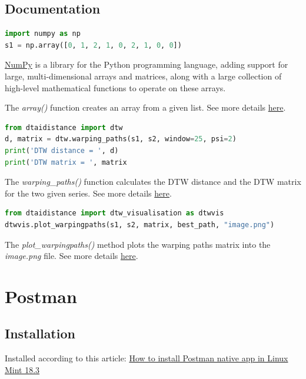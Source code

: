 \documentclass[12pt, a4paper, portrait]{article}
\begin{document}
\subsection{Documentation}
\begin{lstlisting}[language=Python]
import numpy as np
s1 = np.array([0, 1, 2, 1, 0, 2, 1, 0, 0])
\end{lstlisting}
\par\href{http://www.numpy.org/}{NumPy} is a library for the Python programming language, adding support for large, multi-dimensional arrays and matrices, along with a large collection of high-level mathematical functions to operate on these arrays.
\par The \textit{array()} function creates an array from a given list. See more details \href{https://docs.scipy.org/doc/numpy/reference/generated/numpy.array.html#numpy.array}{here}.
\newline
\begin{lstlisting}[language=Python]
from dtaidistance import dtw
d, matrix = dtw.warping_paths(s1, s2, window=25, psi=2)
print('DTW distance = ', d)
print('DTW matrix = ', matrix
\end{lstlisting}

\par The \textit{warping\_paths()} function calculates the DTW distance and the DTW matrix for the two given series. See more details
\href{https://dtaidistance.readthedocs.io/en/latest/modules/dtw.html?highlight=warping_paths#dtaidistance.dtw.warping_paths}{here}.
\newline

\begin{lstlisting}[language=Python]
from dtaidistance import dtw_visualisation as dtwvis
dtwvis.plot_warpingpaths(s1, s2, matrix, best_path, "image.png")
\end{lstlisting}
\par The \textit{plot\_warpingpaths()} method plots the warping paths matrix into the \textit{image.png} file. See more details \href{https://dtaidistance.readthedocs.io/en/latest/modules/dtw_visualisation.html}{here}.


\pagebreak
\section{Postman}
\subsection{Installation}
Installed according to this article: \href{https://r00t4bl3.com/post/how-to-install-postman-native-app-in-linux-mint-18-3-sylvia}{How to install Postman native app in Linux Mint 18.3}
\end{document}
